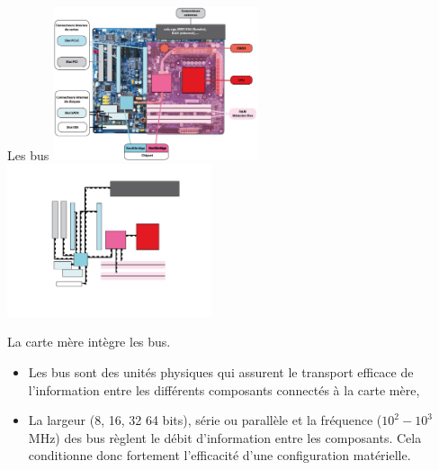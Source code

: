 \begin{frame}{Les bus}
  \includegraphics[width=6cm]{img/s01/carte_mere_commentee_2.jpg}%
  \includegraphics[width=6cm]{img/s01/carte_mere_commentee_3.jpg}%
  \begin{block}{La carte mère intègre les bus.}
    \begin{itemize}
    \item Les bus sont des unités physiques qui assurent le transport
      efficace de l'information entre les différents composants
      connectés à la carte mère,
    \item La largeur (8, 16, 32 64 bits), série ou parallèle et la
      fréquence ($10^2-10^3$ MHz) des bus règlent le débit d'information
      entre les composants. Cela conditionne donc fortement l'efficacité
      d'une configuration matérielle.
    \end{itemize}
  \end{block}
\end{frame}


